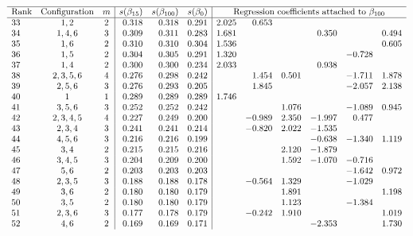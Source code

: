 \documentclass[oneside,10pt]{book}
\begin{document}
\begin{table}%
\footnotesize
\[
\begin{array}{lcc|rrr|rrrrrr}
\hline
\text{Rank}	&	\text{Configuration}	&	m	&	s(\beta_{15}) & s(\beta_{100}) & s(\beta_0)	&	\multicolumn{6}{c}{\text{Regression coefficients attached to } \beta_{100}}		\\
\hline
33	&	1,2	&	2	&	0.318	&	0.318	&	0.291	&	2.025	&	0.653	&		&		&		&		\\
34	&	1,4,6	&	3	&	0.309	&	0.311	&	0.283	&	1.681	&		&		&	0.350	&		&	0.494	\\
35	&	1,6	&	2	&	0.310	&	0.310	&	0.304	&	1.536	&		&		&		&		&	0.605	\\
36	&	1,5	&	2	&	0.304	&	0.305	&	0.291	&	1.320	&		&		&		&	-0.728	&		\\
37	&	1,4	&	2	&	0.300	&	0.300	&	0.234	&	2.033	&		&		&	0.938	&		&		\\
38	&	2,3,5,6	&	4	&	0.276	&	0.298	&	0.242	&		&	1.454	&	0.501	&		&	-1.711	&	1.878	\\
39	&	2,5,6	&	3	&	0.276	&	0.293	&	0.205	&		&	1.845	&		&		&	-2.057	&	2.138	\\
40	&	1	&	1	&	0.289	&	0.289	&	0.289	&	1.746	&		&		&		&		&		\\
41	&	3,5,6	&	3	&	0.252	&	0.252	&	0.242	&		&		&	1.076	&		&	-1.089	&	0.945	\\
42	&	2,3,4,5	&	4	&	0.227	&	0.249	&	0.200	&		&	-0.989	&	2.350	&	-1.997	&	0.477	&		\\
43	&	2,3,4	&	3	&	0.241	&	0.241	&	0.214	&		&	-0.820	&	2.022	&	-1.535	&		&		\\
44	&	4,5,6	&	3	&	0.216	&	0.216	&	0.199	&		&		&		&	-0.638	&	-1.340	&	1.119	\\
45	&	3,4	&	2	&	0.215	&	0.215	&	0.216	&		&		&	2.120	&	-1.879	&		&		\\
46	&	3,4,5	&	3	&	0.204	&	0.209	&	0.200	&		&		&	1.592	&	-1.070	&	-0.716	&		\\
47	&	5,6	&	2	&	0.203	&	0.203	&	0.203	&		&		&		&		&	-1.642	&	0.972	\\
48	&	2,3,5	&	3	&	0.188	&	0.188	&	0.178	&		&	-0.564	&	1.329	&		&	-1.029	&		\\
49	&	3,6	&	2	&	0.180	&	0.180	&	0.179	&		&		&	1.891	&		&		&	1.198	\\
50	&	3,5	&	2	&	0.180	&	0.180	&	0.179	&		&		&	1.123	&		&	-1.384	&		\\
51	&	2,3,6	&	3	&	0.177	&	0.178	&	0.179	&		&	-0.242	&	1.910	&		&		&	1.019	\\
52	&	4,6	&	2	&	0.169	&	0.169	&	0.171	&		&		&		&	-2.353	&		&	1.730	\\

\end{array}\]
\end{table}
\end{document}
